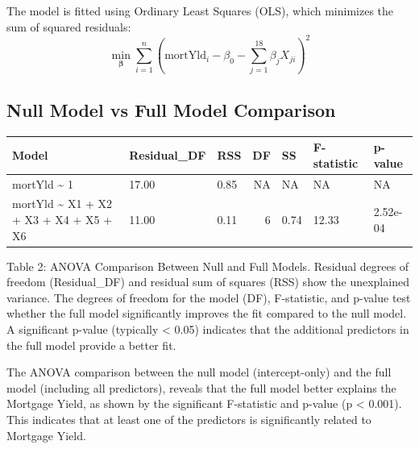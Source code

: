 \documentclass[
  12pt,
]{article}
\begin{document}
\vspace{0.2cm}

The model is fitted using Ordinary Least Squares (OLS), which minimizes
the sum of squared residuals:\\
\vspace{-0.2cm} \[
\min_{\boldsymbol\beta} \sum_{i=1}^n \left( \text{mortYld}_i - \beta_0 - \sum_{j=1}^18 \beta_j X_{ji} \right)^2
\] \vspace{-0.3cm}

\subsection{Null Model vs Full Model
Comparison}\label{null-model-vs-full-model-comparison}

\begin{table}[!h]
\centering\begingroup\fontsize{8}{10}\selectfont

\begin{tabular}{lllrlll}
\toprule
Model & Residual\_DF & RSS & DF & SS & F-statistic & p-value\\
\midrule
mortYld \textasciitilde{} 1 & 17.00 & 0.85 & NA & NA & NA & NA\\
mortYld \textasciitilde{} X1 + X2 + X3 + X4 + X5 + X6 & 11.00 & 0.11 & 6 & 0.74 & 12.33 & 2.52e-04\\
\bottomrule
\end{tabular}
\endgroup{}
\end{table}
\vspace{-0.2em}

\noindent \fontsize{12}{14}\selectfont Table 2: ANOVA Comparison Between
Null and Full Models. Residual degrees of freedom (Residual\_DF) and
residual sum of squares (RSS) show the unexplained variance. The degrees
of freedom for the model (DF), F-statistic, and p-value test whether the
full model significantly improves the fit compared to the null model. A
significant p-value (typically \textless{} 0.05) indicates that the
additional predictors in the full model provide a better fit.

\par

\vspace{1cm}

The ANOVA comparison between the null model (intercept-only) and the
full model (including all predictors), reveals that the full model
better explains the Mortgage Yield, as shown by the significant
F-statistic and p-value (p \textless{} 0.001). This indicates that at
least one of the predictors is significantly related to Mortgage Yield.
\end{document}
